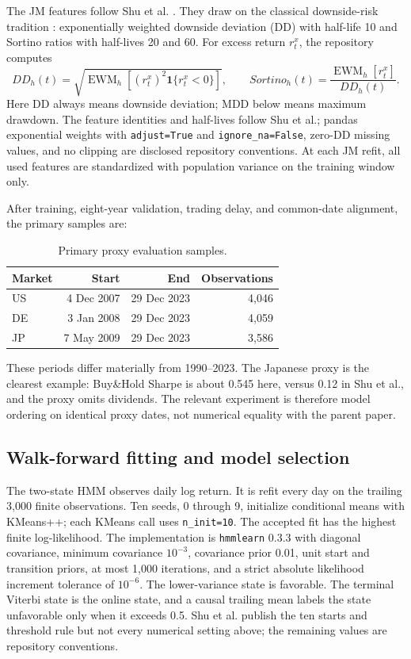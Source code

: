 \documentclass[11pt]{article}
\newcommand{\BH}{Buy\&Hold}
\newcommand{\ind}{\mathbf{1}}
\begin{document}
The JM features follow Shu et al. \citep{shu2024}. They draw on the classical
downside-risk tradition \citep{roy1952,markowitz1959}: exponentially weighted
downside deviation (DD) with half-life 10 and Sortino ratios with half-lives 20
and 60. For excess return \(r^x_t\), the repository computes
\[
DD_h(t)=\sqrt{\operatorname{EWM}_h\!\left[
(r^x_t)^2\ind\{r^x_t<0\}\right]},
\qquad
Sortino_h(t)=\frac{\operatorname{EWM}_h[r^x_t]}{DD_h(t)}.
\]
Here DD always means downside deviation; MDD below means maximum drawdown.
The feature identities and half-lives follow Shu et al.; pandas exponential
weights with \texttt{adjust=True} and \texttt{ignore\_na=False}, zero-DD
missing values, and no clipping are disclosed repository conventions. At each
JM refit, all used
features are standardized with population variance on the training window
only.

After training, eight-year validation, trading delay, and common-date
alignment, the primary samples are:

\begin{table}[!htbp]
\centering
\caption{Primary proxy evaluation samples.}
\label{tab:samples}
\begin{tabular}{lrrr}
\toprule
Market & Start & End & Observations \\
\midrule
US & 4 Dec 2007 & 29 Dec 2023 & 4,046 \\
DE & 3 Jan 2008 & 29 Dec 2023 & 4,059 \\
JP & 7 May 2009 & 29 Dec 2023 & 3,586 \\
\bottomrule
\end{tabular}
\end{table}

These periods differ materially from 1990--2023. The Japanese proxy is the
clearest example: \BH{} Sharpe is about 0.545 here, versus 0.12 in Shu et al.,
and the proxy omits dividends. The relevant experiment is therefore model
ordering on identical proxy dates, not numerical equality with the parent
paper.

\subsection{Walk-forward fitting and model selection}

The two-state HMM observes daily log return. It is refit every day on the
trailing 3,000 finite observations. Ten seeds, 0 through 9, initialize
conditional means with KMeans++; each KMeans call uses
\texttt{n\_init=10}. The accepted fit has the highest finite log-likelihood.
The implementation is \texttt{hmmlearn} 0.3.3 with diagonal covariance,
minimum covariance \(10^{-3}\), covariance prior 0.01, unit start and
transition priors, at most 1,000 iterations, and a strict absolute likelihood
increment tolerance of \(10^{-6}\). The lower-variance state is favorable. The
terminal Viterbi state is the online state, and a causal trailing mean labels
the state unfavorable only when it exceeds 0.5. Shu et al. publish the ten
starts and threshold rule but not every numerical setting above; the remaining
values are repository conventions.
\end{document}
